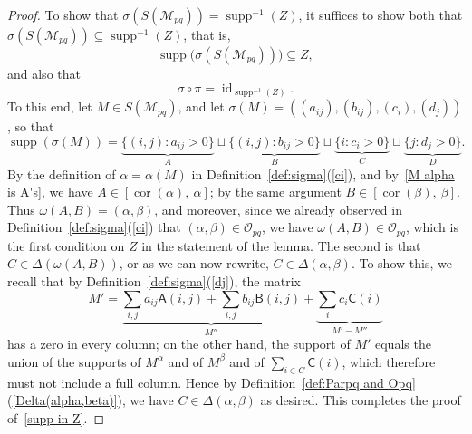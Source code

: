 \documentclass[noamsfonts,10pt]{amsart}
\newcommand{\M}{\mathcal{M}}
\newcommand{\al}{\alpha}
\newcommand{\be}{\beta}
\renewcommand{\O}{\mathcal{O}}
\DeclareMathOperator{\supp}{supp}
\DeclareMathOperator{\cor}{cor}
\newcommand{\sA}{\mathsf{A}}
\newcommand{\sB}{\mathsf{B}}
\newcommand{\sC}{\mathsf{C}}
\newcommand{\1}{\mathbf{1}}
\theoremstyle{plain}
\theoremstyle{definition}
\numberwithin{equation}{section}
\begin{document}
\begin{proof}
    To show that $\sigma(S(\M_{pq})) = \supp^{-1}(Z)$, it suffices to show both that $\sigma(S(\M_{pq})) \subseteq \supp^{-1}(Z)$, that is,
    \begin{equation}
        \label{supp in Z}
        \supp\big(\sigma(S(\M_{pq}))\big) \subseteq Z,
    \end{equation}
    and also that
    \begin{equation}
        \label{sigma circ pi = id}
        \sigma \circ \pi = \operatorname{id}_{\supp^{-1}(Z)}.
    \end{equation}    
    To this end, let $M \in S(\M_{pq})$, and let $\sigma(M) = ( (a_{ij}), (b_{ij}), (c_i), (d_j) )$, so that
    \[
        \supp( \sigma(M)) = \underbrace{\Big\{ (i,j) : a_{ij} > 0 \Big\}}_{A} \sqcup \underbrace{\Big\{ (i,j) : b_{ij} > 0 \Big\}}_{B} \sqcup \underbrace{\Big\{ i : c_i > 0 \Big\}}_{C} \sqcup \underbrace{\Big\{ j : d_j > 0 \Big\}}_{D}.
    \]
    By the definition of $\al = \al(M)$ in Definition~\ref{def:sigma}(\ref{ci}), and by~\eqref{M alpha is A's}, we have $A \in [\cor(\al), \: \al]$;
    by the same argument $B \in [\cor(\be), \: \be]$.
    Thus $\omega(A,B) = (\al, \be)$, and moreover, since we already observed in Definition~\ref{def:sigma}(\ref{ci}) that $(\al, \be) \in \O_{pq}$, we have $\omega(A,B) \in \O_{pq}$, which is the first condition on $Z$ in the statement of the lemma.
    The second is that $C \in \Delta(\omega(A,B))$, or as we can now rewrite, $C \in \Delta(\al, \be)$.
    To show this, we recall that by Definition~\ref{def:sigma}(\ref{dj}), the matrix
    \[
        M' =  \underbrace{\sum_{i,j} a_{ij} \sA(i,j) + \sum_{i,j} b_{ij} \sB(i,j)}_{M''} + \underbrace{\sum_{i} c_{i} \sC(i)}_{M' - M''}
    \]
    has a zero in every column;
    on the other hand, the support of $M'$ equals the union of the supports of $M^\al$ and of $M^\be$ and of $\sum_{i \in C} \sC(i)$, which therefore must not include a full column.
    Hence by Definition~\ref{def:Parpq and Opq}(\ref{Delta(alpha,beta)}), we have $C \in \Delta(\al, \be)$ as desired.
    This completes the proof of~\eqref{supp in Z}.
    

\end{proof}
\end{document}
